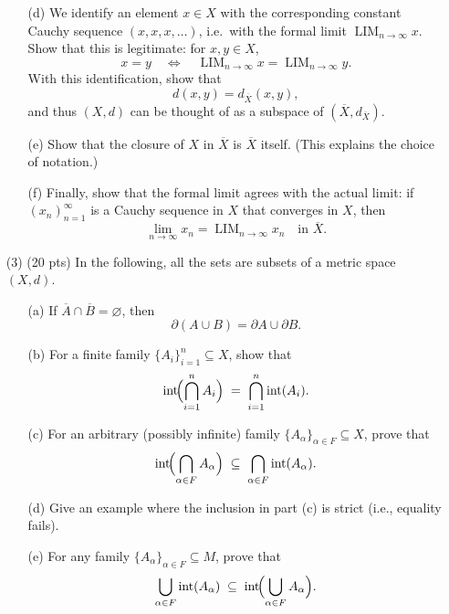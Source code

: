 \documentclass[12pt]{amsart}
\theoremstyle{definition}
\theoremstyle{remark}
\begin{document}
\begin{CJK}{UTF8}{bkai}
\begin{enumerate}
\begin{enumerate}
  \item[(d)] We identify an element $x\in X$ with the corresponding constant Cauchy sequence $(x,x,x,\dots)$, i.e.\ with the formal limit $\operatorname{LIM}_{n\to\infty} x$. Show that this is legitimate: for $x,y\in X$, 
  \[
  x=y \quad \Longleftrightarrow \quad \operatorname{LIM}_{n\to\infty} x = \operatorname{LIM}_{n\to\infty} y.
  \]
  With this identification, show that 
  \[
  d(x,y) = d_{\overline{X}}(x,y),
  \]
  and thus $(X,d)$ can be thought of as a subspace of $(\overline{X},d_{\overline{X}})$.

  \item[(e)] Show that the closure of $X$ in $\overline{X}$ is $\overline{X}$ itself. (This explains the choice of notation.)

  \item[(f)] Finally, show that the formal limit agrees with the actual limit: if $(x_n)_{n=1}^\infty$ is a Cauchy sequence in $X$ that converges in $X$, then
  \[
  \lim_{n\to\infty} x_n = \operatorname{LIM}_{n\to\infty} x_n \quad \text{in } \overline{X}.
  \]
\end{enumerate}

\vfill
\bigskip

\item[(3)]  (20 pts) 	
In the following, all the sets are subsets of a metric space $(X,d)$.

 \begin{enumerate}
  \item[(a)] If $\overline{A}\cap\overline{B}=\varnothing$, then 
  \[
  \partial(A\cup B) = \partial A \cup \partial B.
  \]

  \item[(b)] For a finite family $\{A_i\}_{i=1}^n\subseteq X$, show that
  \[
  \operatorname{int}\!\Bigl(\bigcap_{i=1}^n A_i\Bigr)
  \;=\;
  \bigcap_{i=1}^n \operatorname{int}(A_i).
  \]

  \item[(c)] For an arbitrary (possibly infinite) family $\{A_\alpha\}_{\alpha\in F}\subseteq X$, prove that
  \[
  \operatorname{int}\!\Bigl(\bigcap_{\alpha\in F} A_\alpha\Bigr)
  \;\subseteq\;
  \bigcap_{\alpha\in F}\operatorname{int}(A_\alpha).
  \]

  \item[(d)] Give an example where the inclusion in part \textup{(c)} is strict (i.e., equality fails).

  \item[(e)] For any family $\{A_\alpha\}_{\alpha\in F}\subseteq M$, prove that
  \[
  \bigcup_{\alpha\in F}\operatorname{int}(A_\alpha)
  \;\subseteq\;
  \operatorname{int}\!\Bigl(\bigcup_{\alpha\in F} A_\alpha\Bigr).
  \]


\end{enumerate}
\end{enumerate}
\end{CJK}
\end{document}
